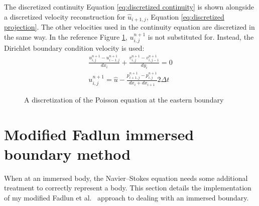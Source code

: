The discretized continuity Equation \eqref{eq:discretized continuity} is shown alongside a discretized velocity reconstruction for $\hat{u}_{i+1,j}$, Equation \eqref{eq:discretized projection}. 
The other velocities used in the continuity equation are discretized in the same way. 
In the reference Figure \ref{fig:ID poisson}, $u_{i,j}^{n+1}$ is not substituted for.
Instead, the Dirichlet boundary condition velocity is used:
\begin{align}
\frac{u_{i,j}^{n+1} - u_{i-1,j}^{n+1}}{dx_i} + \frac{v_{i,j}^{n+1} - v_{i,j-1}^{n+1}}{dy_i} = 0 \label{eq:discretized continuity} \\
u_{i,j}^{n+1} = \hat{u} - \frac{p_{i+1,j}^{n+1} - p_{i,j}^{n+1}}{dx_i + dx_{i+1}}2\Delta t \; \label{eq:discretized projection}
\end{align}
\begin{figure}
	\centering
	
	\caption{A discretization of the Poisson equation at the eastern boundary}
	\label{fig:ID poisson}
\end{figure}

\section{Modified Fadlun immersed boundary method}
\label{sec:ID fadlun}
\label{sec:modified fadlun}
When at an immersed body, the Navier--Stokes equation needs some additional treatment to correctly represent a body. 
This section details the implementation of my modified Fadlun et al.~\cite{Fadlun:2000fl} approach to dealing with an immersed boundary.

